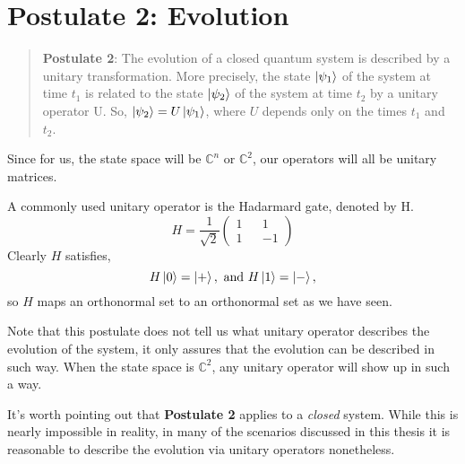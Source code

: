 \section{Postulate 2: Evolution}

\begin{quote}
    \textbf{Postulate 2}: The evolution of a closed quantum system is described by a unitary transformation. More precisely, the state $\ket{\psi_1}$ of the system at time $t_1$ is related to the state $\ket{\psi_2}$ of the system at time $t_2$ by a unitary operator U.  So, $\ket{\psi_2}=U\ket{\psi_1}$, where $U$ depends only on the times $t_1$ and $t_2$.
\end{quote}

Since for us, the state space will be ${\mathbb{C}}^n$ or ${\mathbb{C}}^2$, our operators will all be unitary matrices.  

\begin{example} 
A commonly used unitary operator is the Hadarmard gate, denoted by H.  
\begin{equation}
   H=\frac{1}{\sqrt{2}}\begin{pmatrix}
1 && 1\\
1 && -1
\end{pmatrix} 
\end{equation}
Clearly $H$ satisfies,
$$H\ket{0}=\ket{+}, \textrm{ and }H\ket{1}=\ket{-},$$
so $H$ maps an orthonormal set to an orthonormal set as we have seen.

\end{example}


Note that this postulate does not tell us what unitary operator describes the evolution of the system, it only assures that the evolution can be described in such way.  When the state space is ${\mathbb{C}}^2$, any unitary operator will show up in such a way.

It's worth pointing out that {\bf{Postulate 2}} applies to a \emph{closed} system.  While this is nearly impossible in reality, in many of the scenarios discussed in this thesis it is reasonable to describe the evolution via unitary operators nonetheless.





\pagebreak
